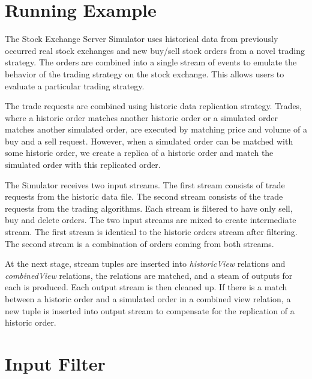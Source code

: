 \documentclass{article}
\begin{document}


\section{Running Example}

The Stock Exchange Server Simulator uses historical data from previously occurred real stock exchanges and new  buy/sell stock orders from a novel trading strategy. The orders are combined into a single stream of events to emulate the behavior of the trading strategy on the stock exchange. This allows users to evaluate a particular trading strategy. 

The trade requests are combined using historic data replication strategy. Trades, where a historic order matches another historic order or a simulated order matches another simulated order, are executed by matching price and volume of a buy and a sell request. However, when a simulated order can be matched with some historic order, we create a replica of a historic order and match the simulated order with this replicated order.

The Simulator receives two input streams. The first stream consists of trade requests from the historic data file. The second stream consists of the trade requests from the trading algorithms. Each stream is filtered to have only sell, buy and delete orders. The two input streams are mixed to create intermediate stream. The first stream is identical to the historic orders stream after filtering. The second stream is a combination of orders coming from both streams. 

At the next stage, stream tuples are inserted into  \emph{historicView} relations and \emph{combinedView} relations, the relations are matched, and a steam of outputs for each is produced. Each output stream is then cleaned up. If there is a match between a historic order and a simulated order in a combined view relation, a new tuple is inserted into output stream to compensate for the replication of a historic order.


\section{Input Filter}
\end{document}
